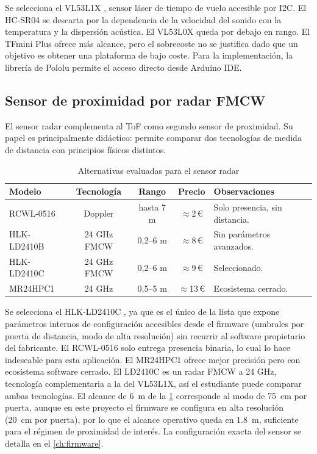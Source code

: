 Se selecciona el VL53L1X \cite{ds_vl53l1x}, sensor láser de tiempo
de vuelo accesible por I2C. El HC-SR04 se descarta por la dependencia de la
velocidad del sonido con la temperatura y la dispersión acústica. El
VL53L0X queda por debajo en rango. El TFmini Plus ofrece más alcance, pero
el sobrecoste no se justifica dado que un objetivo es obtener una plataforma de bajo coste. Para la implementación, la librería de Pololu \cite{lib_vl53l1x} permite el acceso directo desde Arduino IDE.


\subsection{Sensor de proximidad por radar FMCW}
\label{sec:sel_radar}

El sensor radar complementa al ToF como segundo sensor de proximidad. Su
papel es principalmente didáctico: permite comparar dos tecnologías de medida
de distancia con principios físicos distintos.

\begin{table}[H]
    \centering
    \caption{Alternativas evaluadas para el sensor radar}
    \label{tab:sel_radar}
    \footnotesize
    \begin{tabularx}{\linewidth}{l c c c X}
        \toprule
        \textbf{Modelo} & \textbf{Tecnología} & \textbf{Rango} & \textbf{Precio} & \textbf{Observaciones} \\
        \midrule
        RCWL-0516   & Doppler     & hasta 7 m & $\approx$2\,\euro{}  & Solo presencia, sin distancia. \\
        HLK-LD2410B & 24 GHz FMCW & 0,2--6 m  & $\approx$8\,\euro{}  & Sin parámetros avanzados. \\
        HLK-LD2410C & 24 GHz FMCW & 0,2--6 m  & $\approx$9\,\euro{}  & Seleccionado. \\
        MR24HPC1    & 24 GHz      & 0,5--5 m  & $\approx$13\,\euro{} & Ecosistema cerrado. \\
        \bottomrule
    \end{tabularx}
\end{table}

Se selecciona el HLK-LD2410C \cite{ds_ld2410c}, ya que es el único de la lista
que expone parámetros internos de configuración accesibles desde el
firmware (umbrales por puerta de distancia, modo de alta resolución) sin
recurrir al software propietario del fabricante. El RCWL-0516 solo entrega
presencia binaria, lo cual lo hace indeseable para esta aplicación. El MR24HPC1 ofrece
mejor precisión pero con ecosistema software cerrado. El
LD2410C es un radar FMCW a 24 GHz, tecnología complementaria a la del VL53L1X, así el estudiante puede comparar ambas tecnologías. El alcance de \SI{6}{\meter} de la \cref{tab:sel_radar} corresponde al modo de \SI{75}{\centi\meter} por puerta, aunque en este proyecto el firmware se configura en alta resolución (\SI{20}{\centi\meter} por puerta), por lo que el alcance operativo queda en \SI{1.8}{\meter}, suficiente para el régimen de proximidad de interés. La configuración exacta del sensor se detalla en el \cref{ch:firmware}.


